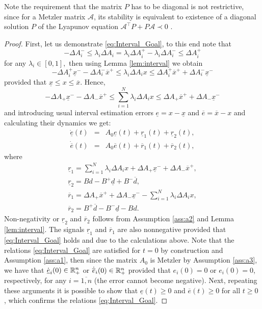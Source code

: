 \documentclass[letterpaper, 10 pt, conference]{ieeeconf}
\theoremstyle{plain}
\theoremstyle{definition}
\theoremstyle{plain}
\theoremstyle{plain}
\theoremstyle{remark}
\begin{document}
Note the requirement that the matrix $P$ has to be diagonal is not restrictive, since for a Metzler matrix $\mathcal{A}$, its stability is equivalent to existence of a diagonal solution $P$ of the Lyapunov equation $\mathcal{A}^{\top}P+P\mathcal{A}\prec0$ \cite{FarinaRinaldi2000}.
\begin{proof}
First, let us demonstrate \eqref{eq:Interval_Goal}, to this end note that
\[
-\Delta A_{i}^{-}\leq\lambda_{i}\Delta A_{i}=\lambda_{i}\Delta A_{i}^{+}-\lambda_{i}\Delta A_{i}^{-}\leq\Delta A_{i}^{+}
\]
for any $\lambda_{i}\in[0,1],$ then using Lemma \ref{lem:interval} we obtain
\[
-\Delta A_{i}^{+}\underline{x}^{-}-\Delta A_{i}^{-}\overline{x}^{+}\leq\lambda_{i}\Delta A_{i}x\leq\Delta A_{i}^{+}\overline{x}^{+}+\Delta A_{i}^{-}\underline{x}^{-}
\]
provided that $\underline{x}\leq x\leq\overline{x}$. Hence,
\[
-\Delta A_{+}\underline{x}^{-}-\Delta A_{-}\overline{x}^{+}\leq\sum_{i=1}^{N}\lambda_{i}\Delta A_{i}x\leq\Delta A_{+}\overline{x}^{+}+\Delta A_{-}\underline{x}^{-}
\]
and introducing usual interval estimation errors $\underline{e}=x-\underline{x}$ and $\overline{e}=\overline{x}-x$ and calculating their dynamics we get:
\begin{eqnarray*}
\dot{\underline{e}}(t) & = & A_{0}\underline{e}(t)+\underline{r}_{1}(t)+\underline{r}_{2}(t),\\
\dot{\overline{e}}(t) & = & A_{0}\overline{e}(t)+\overline{r}_{1}(t)+\overline{r}_{2}(t),
\end{eqnarray*}
where
\begin{gather*}
\underline{r}_{1}=\sum_{i=1}^{N}\lambda_{i}\Delta A_{i}x+\Delta A_{+}\underline{x}^{-}+\Delta A_{-}\overline{x}^{+},\\
\underline{r}_{2}=Bd-B^{+}\underline{d}+B^{-}\overline{d},\\
\overline{r}_{1}=\Delta A_{+}\overline{x}^{+}+\Delta A_{-}\underline{x}^{-}-\sum_{i=1}^{N}\lambda_{i}\Delta A_{i}x,\\
\overline{r}_{2}=B^{+}\overline{d}-B^{-}\underline{d}-Bd.
\end{gather*}
Non-negativity or $\underline{r}_{2}$ and $\overline{r}_{2}$ follows from Assumption \ref{ass:a2} and Lemma \ref{lem:interval}. The signals $\underline{r}_{1}$ and $\overline{r}_{1}$ are also nonnegative provided that \eqref{eq:Interval_Goal} holds and due to the calculations above. Note that the relations \eqref{eq:Interval_Goal} are satisfied for $t=0$ by construction and Assumption \ref{ass:a1}, then since the matrix $A_{0}$ is Metzler by Assumption \ref{ass:a3}, we have that $\dot{\underline{e}}_{i}(0)\in\mathbb{R}_{+}^{n}$ or $\dot{\overline{e}}_{i}(0)\in\mathbb{R}_{+}^{n}$ provided that $e_{i}(0)=0$ or $e_{i}(0)=0$, respectively, for any $i=\overline{1,n}$ (the error cannot become negative). Next, repeating these arguments it is possible to show that $\underline{e}(t)\geq0$ and $\overline{e}(t)\geq0$ for all $t\geq0$ \cite{Smith95}, which confirms the relations \eqref{eq:Interval_Goal}.


\end{proof}
\end{document}
